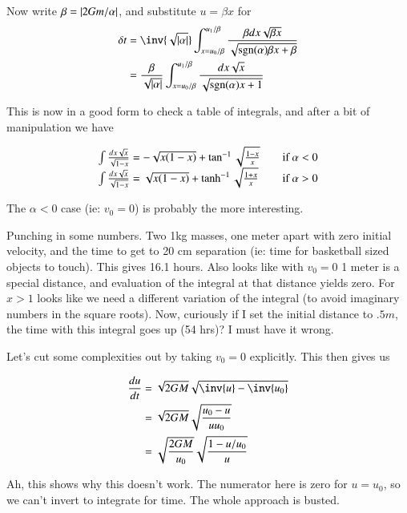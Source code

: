 \documentclass{article}
\DeclareMathOperator{\sgn}{sgn}
\begin{document}
Now write $\beta = \left\lvert{2Gm/\alpha}\right\rvert$, and substitute $u = \beta x$ for
\begin{align*}
\delta t 
&=  \inv{\sqrt{\Abs{\alpha}}} \int_{x= u_0/\beta}^{u_1/\beta} \frac{\beta dx \sqrt{\beta x}}{\sqrt{\sgn(\alpha) \beta x + \beta}} \\
&=  \frac{\beta}{\sqrt{\Abs{\alpha}}} \int_{x= u_0/\beta}^{u_1/\beta} \frac{dx \sqrt{ x}}{\sqrt{\sgn(\alpha)  x + 1}} \\
\end{align*}

This is now in a good form to check a table of integrals, and after a bit of manipulation we have

\begin{align*}
\begin{array}{l l}
\int \frac{dx \sqrt{ x}}{\sqrt{1 - x}} = - \sqrt{x(1-x)} + \tan^{-1}{\sqrt{\frac{1-x}{x}}} & \quad \mbox{if $\alpha < 0$} \\
\int \frac{dx \sqrt{ x}}{\sqrt{1 - x}} = \sqrt{x(1-x)} + \tanh^{-1}{\sqrt{\frac{1+x}{x}}} & \quad \mbox{if $\alpha > 0$} \\
\end{array}
\end{align*}

The $\alpha < 0$ case (ie: $v_0 = 0$) is probably the more interesting.

Punching in some numbers.  Two 1kg masses, one meter apart with zero initial velocity, and the time to get to 20 cm separation (ie: time for basketball sized objects to touch).  This gives 16.1 hours.  Also looks like with $v_0 = 0$ 1 meter is a special distance, and evaluation of the integral at that distance yields zero.  For $x>1$ looks like we need a different variation of the integral (to avoid imaginary numbers in the square roots).  Now, curiously if I set the initial distance to $.5 m$, the time with this integral goes up (54 hrs)?  I must have it wrong.

Let's cut some complexities out by taking $v_0 = 0$ explicitly.  This then gives us

\begin{align*}
\frac{du}{dt}
&= \sqrt{2GM} \sqrt{\inv{u} - \inv{u_0}} \\
&= \sqrt{2GM} \sqrt{\frac{u_0 - u}{u u_0}} \\
&= \sqrt{\frac{2GM}{u_0}} \sqrt{\frac{1 - u/u_0}{u}} \\
\end{align*}

Ah, this shows why this doesn't work.  The numerator here is zero for $u = u_0$, so we can't invert to integrate for time.  The whole approach is busted.

%
%
\end{document}
